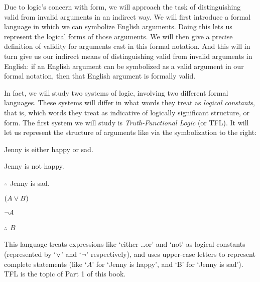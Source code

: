Due to logic's concern with form, we will approach the task of distinguishing valid from invalid arguments in an indirect way. We will first introduce a formal language in which we can symbolize English arguments.  Doing this lets us represent the logical forms of those arguments.  We will then give a precise definition of validity for arguments cast in this formal notation.  And this will in turn give us our indirect means of distinguishing valid from invalid arguments in English: if an English argument can be symbolized as a valid argument in our formal notation, then that English argument is formally valid.  %

In fact, we will study two systems of logic, involving two different formal languages. These systems will differ in what words they treat as \emph{logical constants}, that is,  which words they treat as indicative of logically significant structure, or form.  The first system we will study is \emph{Truth-Functional Logic} (or TFL).  It will let us represent the structure of arguments like  via the symbolization to the right:

\begin{multicols}{2}

	\begin{earg}
		\item[\eref{exarg8}] Jenny is either happy or sad.
		\item[] Jenny is not happy.
		\item[] $\therefore$ Jenny is sad.
	\end{earg}

\columnbreak

	\begin{earg}
		\item[] $(A \vee B)$
		\item[] $\neg A$
		\item[] $\therefore$ $B$
	\end{earg}

\end{multicols}

\noindent This language treats expressions like `either \ldots or' and `not' as logical constants (represented by `$\vee$' and `$\neg$' respectively), and uses upper-case letters to represent complete statements (like `$A$' for `Jenny is happy', and `B' for `Jenny is sad').  TFL is the topic of Part 1 of this book.

